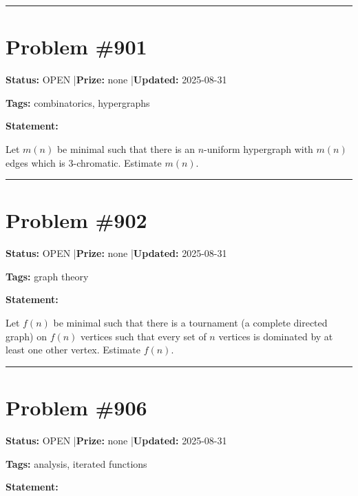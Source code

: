 \documentclass{article}
\begin{document}
\noindent\rule{\linewidth}{0.4pt}


\section{Problem \#901}
\label{prob:901}

\noindent\textbf{Status:} OPEN \quad|\quad \textbf{Prize:} none \quad|\quad \textbf{Updated:} 2025-08-31

\noindent\textbf{Tags:} combinatorics, hypergraphs

\medskip

\noindent\textbf{Statement:}

Let $m(n)$ be minimal such that there is an $n$-uniform hypergraph with $m(n)$ edges which is $3$-chromatic. Estimate $m(n)$.

\noindent\rule{\linewidth}{0.4pt}


\section{Problem \#902}
\label{prob:902}

\noindent\textbf{Status:} OPEN \quad|\quad \textbf{Prize:} none \quad|\quad \textbf{Updated:} 2025-08-31

\noindent\textbf{Tags:} graph theory

\medskip

\noindent\textbf{Statement:}

Let $f(n)$ be minimal such that there is a tournament (a complete directed graph) on $f(n)$ vertices such that every set of $n$ vertices is dominated by at least one other vertex. Estimate $f(n)$.

\noindent\rule{\linewidth}{0.4pt}


\section{Problem \#906}
\label{prob:906}

\noindent\textbf{Status:} OPEN \quad|\quad \textbf{Prize:} none \quad|\quad \textbf{Updated:} 2025-08-31

\noindent\textbf{Tags:} analysis, iterated functions

\medskip

\noindent\textbf{Statement:}
\end{document}
